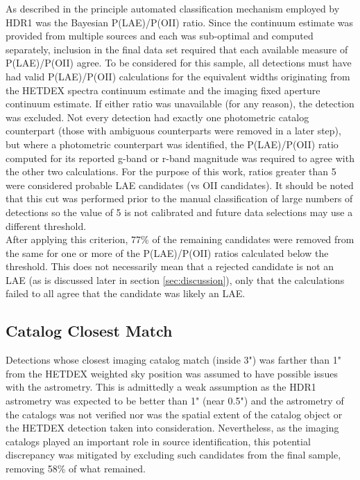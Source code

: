 \documentclass{aastex62}
\begin{document}
As described in \cite{Leung} the principle automated classification mechanism employed by HDR1 was the Bayesian P(LAE)/P(OII) ratio. Since the continuum estimate was provided from multiple sources and each was sub-optimal and computed separately, inclusion in the final data set required that each available measure of P(LAE)/P(OII) agree. To be considered for this sample, all detections must have had valid P(LAE)/P(OII) calculations for the equivalent widths originating from the HETDEX spectra continuum estimate and the imaging fixed aperture continuum estimate. If either ratio was unavailable (for any reason), the detection was excluded. Not every detection had exactly one photometric catalog counterpart (those with ambiguous counterparts were removed in a later step), but where a photometric counterpart was identified, the P(LAE)/P(OII) ratio computed for its reported g-band or r-band magnitude was required to agree with the other two calculations. For the purpose of this work, ratios greater than 5 were considered probable LAE candidates (vs OII candidates). It should be noted that this cut was performed prior to the manual classification of large numbers of detections so the value of 5 is not calibrated and future data selections may use a different threshold.\\

After applying this criterion, 77\% of the remaining candidates were removed from the same for one or more of the P(LAE)/P(OII) ratios calculated below the threshold. This does not necessarily mean that a rejected candidate is not an LAE (as is discussed later in section \ref{sec:discussion}), only that the calculations failed to all agree that the candidate was likely an LAE.\\

\subsection{Catalog Closest Match}
Detections whose closest imaging catalog match (inside 3") was farther than 1" from the HETDEX weighted sky position was assumed to have possible issues with the astrometry. This is admittedly a weak assumption as the HDR1 astrometry was expected to be better than 1" (near 0.5") and the astrometry of the catalogs was not verified nor was the spatial extent of the catalog object or the HETDEX detection taken into consideration. Nevertheless, as the imaging catalogs played an important role in source identification, this potential discrepancy was mitigated by excluding such candidates from the final sample, removing 58\% of what remained.\\
\end{document}
